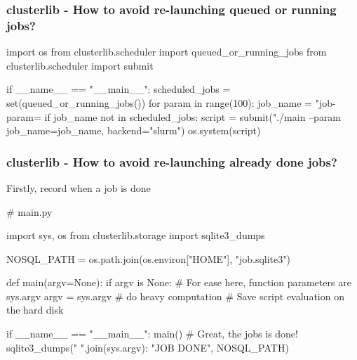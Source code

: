 \documentclass[11pt,compress,serif]{beamer}
\begin{document}
\begin{frame}[fragile=singleslide]
\frametitle{clusterlib - How to avoid re-launching queued or running jobs?}
    

\begin{pythoncode}
import os
from clusterlib.scheduler import queued_or_running_jobs
from clusterlib.scheduler import submit

if __name__ == "__main__":
    scheduled_jobs = set(queued_or_running_jobs())
    for param in range(100):
        job_name = "job-param=%
        if job_name not in scheduled_jobs:
            script = submit("./main --param %
                            job_name=job_name,
                            backend="slurm")
            os.system(script)
\end{pythoncode}

\end{frame}

\begin{frame}[fragile=singleslide]
\frametitle{clusterlib - How to avoid re-launching already done jobs?}

Firstly, record when a job is done

\begin{pythoncode}
# main.py

import sys, os
from clusterlib.storage import sqlite3_dumps

NOSQL_PATH = os.path.join(os.environ["HOME"], "job.sqlite3")

def main(argv=None):
    if argv is None: # For ease here, function parameters are sys.argv
        argv = sys.argv  
    # do heavy computation
    # Save script evaluation on the hard disk

if __name__ == "__main__":
     main()
     # Great, the jobs is done!
     sqlite3_dumps({" ".join(sys.argv): "JOB DONE"}, NOSQL_PATH)
\end{pythoncode}

\end{frame}
\end{document}
